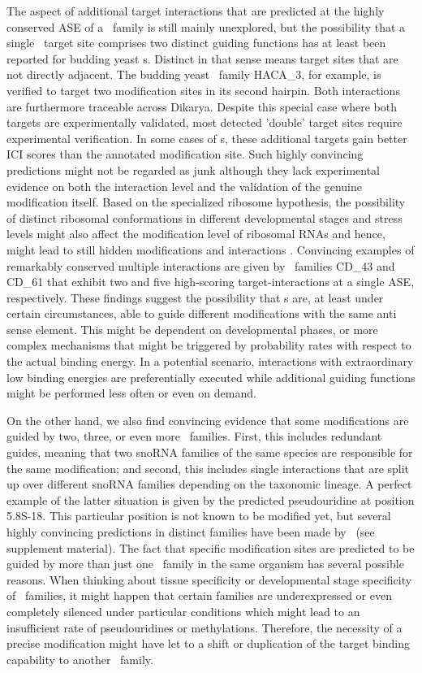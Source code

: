 The aspect of additional target interactions that are predicted at the
highly conserved ASE of a \sno\ family is still mainly unexplored, but the
possibility that a single \sno\ target site comprises two distinct
guiding functions has
at least been reported for budding yeast \haca s. Distinct in that
sense means target sites that are not directly adjacent. The
budding yeast \sno\ family HACA\_3, for example, is
verified to target two modification sites in its second hairpin. Both
interactions are furthermore traceable across Dikarya. Despite this
special case where both targets are experimentally validated, most
detected 'double' target sites require experimental verification.
In some cases of \haca s, these additional targets gain better ICI
scores than the annotated modification site. Such highly
convincing predictions might not be regarded as junk although they
lack experimental evidence on both the interaction level and the
validation of the genuine modification itself. Based on the
specialized ribosome hypothesis, the possibility of distinct ribosomal
conformations in different developmental stages and stress levels
might also affect the modification level of ribosomal RNAs and hence,
might lead to still hidden modifications and interactions \citep{Xue:2012}.
Convincing examples of remarkably conserved multiple interactions are
given by \cd\ families CD\_43 and CD\_61 that exhibit two and five
high-scoring target-interactions at a single ASE, respectively.
These findings suggest the possibility
that \sno s are, at least under certain circumstances, able to guide
different modifications with the same anti sense element. This might
be dependent on developmental phases, or more complex mechanisms that
might be triggered by probability rates with respect to the actual
binding energy. In a potential scenario, interactions with
extraordinary low binding energies are preferentially executed while
additional guiding functions might be performed less often or even on
demand. 

On the other hand, we also find convincing evidence that some
modifications are guided by two, three, or
even more \sno\ families. First, this includes redundant guides, meaning that
two snoRNA families of the same species are responsible for the same
modification; and second, this includes single interactions that are split up over different
snoRNA families depending on the taxonomic lineage. A perfect example of the latter situation is given by the
predicted pseudouridine at position 5.8S-18. This particular
position is not known to be modified yet, but several highly convincing
predictions in distinct families have been made by \snoop\ (see supplement material).
The fact that specific modification sites are predicted
to be guided by more than just one \sno\ family in the same organism has several
possible reasons. When thinking about tissue specificity or
developmental stage specificity of \sno\ families, it might happen
that certain families are underexpressed or even completely silenced
under particular conditions which might lead to an insufficient
rate of pseudouridines or methylations. Therefore, the necessity of a precise
modification might have let to a shift or duplication of the target
binding capability to another \sno\ family. 

